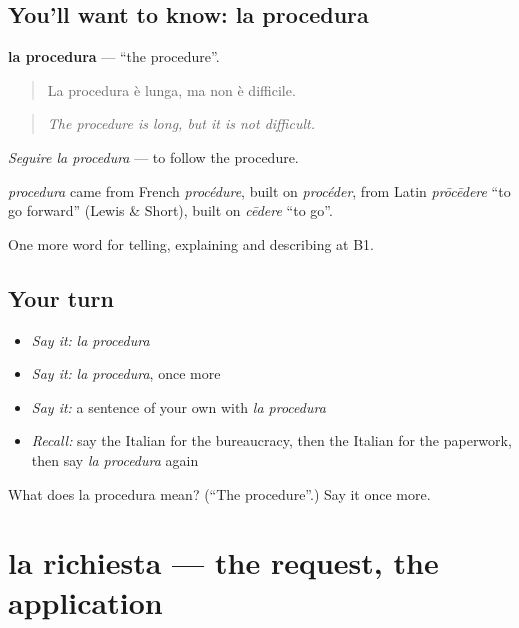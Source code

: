 \subsection*{You'll want to know: la procedura}
\textbf{la procedura} — \textquotedblleft{}the procedure\textquotedblright{}.

\begin{quote}
La procedura è lunga, ma non è difficile.
\end{quote}

\begin{quote}
\emph{The procedure is long, but it is not difficult.}
\end{quote}

\emph{Seguire la procedura} — to follow the procedure.

\begin{cousinweb}
\emph{procedura} came from French \emph{procédure}, built on \emph{procéder}, from Latin \emph{prōcēdere} \textquotedblleft{}to go forward\textquotedblright{} (Lewis \& Short), built on \emph{cēdere} \textquotedblleft{}to go\textquotedblright{}.
\end{cousinweb}

\begin{grammarlens}[title={What you've built}]
One more word for telling, explaining and describing at B1.
\end{grammarlens}

\subsection*{Your turn}
\begin{itemize}
\raggedright
  \item \emph{Say it:} \emph{la procedura}
  \item \emph{Say it:} \emph{la procedura}, once more
  \item \emph{Say it:} a sentence of your own with \emph{la procedura}
  \item \emph{Recall:} say the Italian for the bureaucracy, then the Italian for the paperwork, then say \emph{la procedura} again
\end{itemize}

\begin{tcolorbox}[breakable,colback=teal!4,colframe=teal!35!black,title={Before you move on}]
What does la procedura mean? (\textquotedblleft{}The procedure\textquotedblright{}.) Say it once more.
\end{tcolorbox}
\section[la richiesta]{la richiesta — the request, the application}

